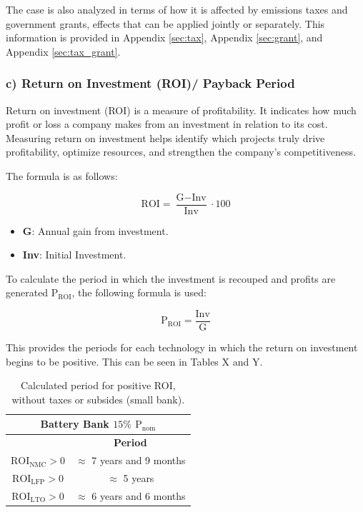 The case is also analyzed in terms of how it is affected by emissions taxes and government grants, effects that can be applied jointly or separately. This information is provided in Appendix \ref{sec:tax}, Appendix \ref{sec:grant}, and Appendix \ref{sec:tax_grant}. 

\subsubsection{c) Return on Investment (ROI)/ Payback Period}

Return on investment (ROI) is a measure of profitability. It indicates how much profit or loss a company makes from an investment in relation to its cost. Measuring return on investment helps identify which projects truly drive profitability, optimize resources, and strengthen the company's competitiveness.

The formula is as follows:

\begin{equation}
\text{ROI} = \frac{\text{G} - \text{Inv}}{\text{Inv}}\cdot 100
\end{equation}

\begin{itemize}
	\item \textbf{G}: Annual gain from investment.
	\item \textbf{Inv}: Initial Investment.
\end{itemize}

To calculate the period in which the investment is recouped and profits are generated ${\text{P}}_{\text{ROI}}$, the following formula is used:

\begin{equation}
{\text{P}}_{\text{ROI}} = \frac{\text{Inv}}{\text{G}}
\end{equation}

This provides the periods for each technology in which the return on investment begins to be positive. This can be seen in Tables X and Y.

\begin{table}[H]
	\centering
	\caption{Calculated period for positive ROI, without taxes or subsides (small bank).}
	\label{tab:roi1}
	\begin{tabular}{|c|c|}
		\hline
		\multicolumn{2}{|c|}{Battery Bank $15\%$ ${\text{P}}_{\text{nom}}$} \\
		\hline\hline
		    & \textbf{Period}\\
		 \hline
	${\text{ROI}}_{\text{NMC}}>0$ & $\approx$ 7 years and 9 months\\
		 \hline
	${\text{ROI}}_{\text{LFP}}>0$ & $\approx$ 5 years \\
		 \hline
 	${\text{ROI}}_{\text{LTO}}>0$ & $\approx$ 6 years and 6 months\\
		 \hline
	\end{tabular}
\end{table}


